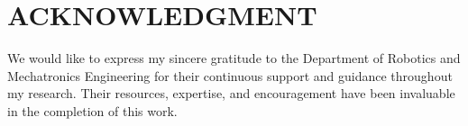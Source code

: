 \section*{ACKNOWLEDGMENT}
We would like to express my sincere gratitude to the Department of Robotics and Mechatronics Engineering for their continuous support and guidance throughout my research. Their resources, expertise, and encouragement have been invaluable in the completion of this work.
